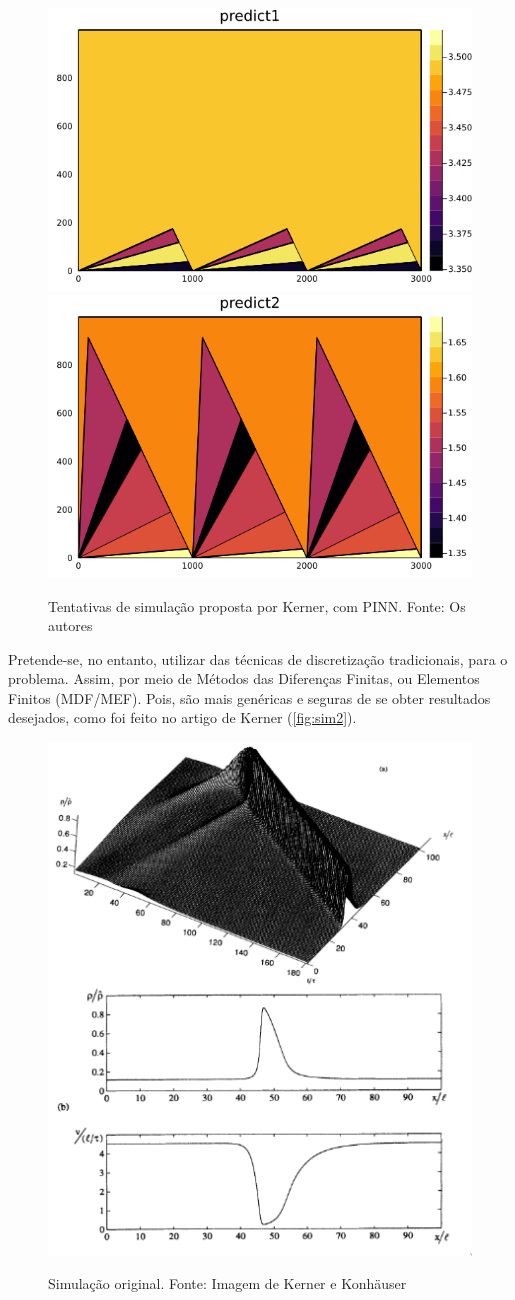 \documentclass[12pt, brazilian]{article}
\begin{document}
\begin{figure}[ht]
  \centering
  \caption{\label{fig:sim1} Tentativas de simulação proposta por Kerner, com PINN. Fonte: Os autores}
  \includegraphics[width=0.45\linewidth]{sol_variable_corrected_bcs31.png}
  \includegraphics[width=0.45\linewidth]{sol_variable_corrected_bcs32.png}
  \\ %
\end{figure}

Pretende-se, no entanto, utilizar das técnicas de discretização tradicionais, para o problema. Assim, por meio de Métodos das Diferenças Finitas, ou Elementos Finitos (MDF/MEF). Pois, são mais genéricas e seguras de se obter resultados desejados, como foi feito no artigo de Kerner (\autoref{fig:sim2}).

\begin{figure}[ht]
  \centering
  \caption{\label{fig:sim2} Simulação original. Fonte: Imagem de Kerner e Konhäuser \cite{kerner1993cluster}}
  \includegraphics[width=0.4\linewidth]{kerner.png}
  \\  %
\end{figure}


\clearpage


\end{document}
